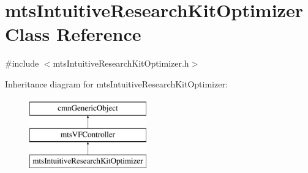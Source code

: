\hypertarget{classmts_intuitive_research_kit_optimizer}{}\section{mts\+Intuitive\+Research\+Kit\+Optimizer Class Reference}
\label{classmts_intuitive_research_kit_optimizer}


{\ttfamily \#include $<$mts\+Intuitive\+Research\+Kit\+Optimizer.\+h$>$}

Inheritance diagram for mts\+Intuitive\+Research\+Kit\+Optimizer\+:\begin{figure}[H]
\begin{center}
\leavevmode
\includegraphics[height=3.000000cm]{d9/dc5/classmts_intuitive_research_kit_optimizer}
\end{center}
\end{figure}
